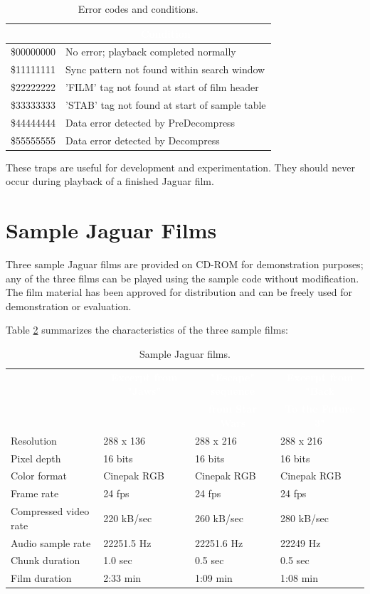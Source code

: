 \documentclass[12pt,letterpaper,twoside]{article}
\newcommand{\tabheadtxt}[1]{\multicolumn{1}{c}{\textcolor{white}{\textbf{#1}}}}
\begin{document}
\begin{table}[h]
\centering
\begin{tabular}{|c|p{12cm}|}
\hline
\rowcolor{black}
\tabheadtxt{Code} & \tabheadtxt{Condition} \\
\hline
\$00000000 & No error; playback completed normally \\
\hline
\$11111111 & Sync pattern not found within search window \\
\hline
\$22222222 & 'FILM' tag not found at start of film header \\
\hline
\$33333333 & 'STAB' tag not found at start of sample table \\
\hline
\$44444444 & Data error detected by PreDecompress \\
\hline
\$55555555 & Data error detected by Decompress \\
\hline
\end{tabular}
\caption{Error codes and conditions.}
\label{tab:errorcodes}
\end{table}
\FloatBarrier

These traps are useful for development and experimentation. They should never occur during playback of a finished Jaguar film.

\section{Sample Jaguar Films}
Three sample Jaguar films are provided on CD-ROM for demonstration purposes; any of the three films can be played using the sample code without modification. The film material has been approved for distribution and can be freely used for demonstration or evaluation.

Table \ref{tab:samplefilms} summarizes the characteristics of the three sample films:

\begin{table}[h]
\centering
\begin{tabular}{|l|l|l|l|}
\hline
\rowcolor{black}
 & \tabheadtxt{Excerpt from "Jaws"} & \tabheadtxt{"Escape" sequence} & \tabheadtxt{Excerpt from "Back}\\
\rowcolor{black}
 & & \tabheadtxt{ from Star Wars} & \tabheadtxt{ To the Future 3"}\\
\hline
Resolution & 288 x 136 & 288 x 216 & 288 x 216\\
\hline
Pixel depth & 16 bits & 16 bits & 16 bits\\
\hline
Color format & Cinepak RGB & Cinepak RGB & Cinepak RGB\\
\hline
Frame rate & 24 fps & 24 fps & 24 fps\\
\hline
Compressed video rate & 220 kB/sec & 260 kB/sec & 280 kB/sec\\
\hline
Audio sample rate & 22251.5 Hz & 22251.6 Hz & 22249 Hz\\
\hline
Chunk duration & 1.0 sec & 0.5 sec & 0.5 sec\\
\hline
Film duration & 2:33 min & 1:09 min & 1:08 min\\
\hline
\end{tabular}
\caption{Sample Jaguar films.}
\label{tab:samplefilms}
\end{table}
\FloatBarrier
\end{document}

